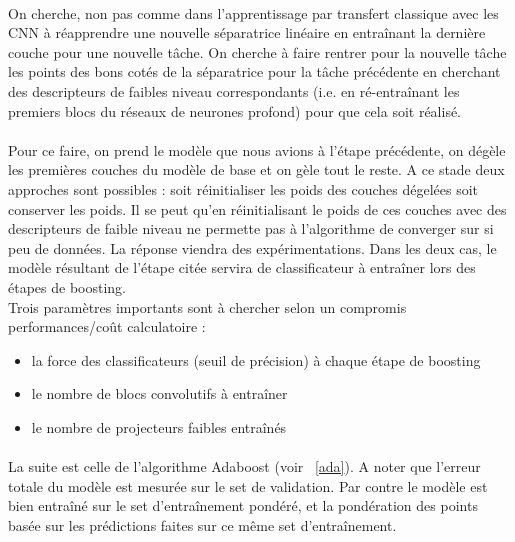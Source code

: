 \documentclass[11 pt]{article}
\begin{document}
\paragraph{}On cherche, non pas comme dans l'apprentissage par transfert classique avec les CNN à réapprendre une nouvelle séparatrice linéaire en entraînant la dernière couche pour une nouvelle tâche. On cherche à faire rentrer pour la nouvelle tâche les points des bons cotés de la séparatrice pour la tâche précédente en cherchant des descripteurs de faibles niveau correspondants (i.e. en ré-entraînant les premiers blocs du réseaux de neurones profond) pour que cela soit réalisé.

\paragraph{}Pour ce faire,  on prend le modèle que nous avions à l’étape précédente, on dégèle les premières couches du modèle de base et on gèle tout le reste. A ce stade deux approches sont possibles : soit réinitialiser les poids des couches dégelées soit conserver les poids. Il se peut qu’en réinitialisant le poids de ces couches avec des descripteurs de faible niveau ne permette pas à l’algorithme de converger sur si peu de données. La réponse viendra des expérimentations. Dans les deux cas, le modèle résultant de l’étape citée servira de classificateur à entraîner lors des étapes de boosting.\\

Trois paramètres importants sont à chercher selon un compromis performances/coût calculatoire :\\ \medskip
\begin{itemize}
  \item la force des classificateurs (seuil de précision) à chaque étape de boosting
  \item le nombre de blocs convolutifs à entraîner
  \item le nombre de projecteurs faibles entraînés
\end{itemize}

\paragraph{}La suite est celle de l’algorithme Adaboost (voir ~\ref{ada}). A noter que l’erreur totale du modèle est mesurée sur le set de validation. Par contre le modèle est bien entraîné sur le set d’entraînement pondéré, et la pondération des points basée sur les prédictions faites sur ce même set d’entraînement.\\
\end{document}
